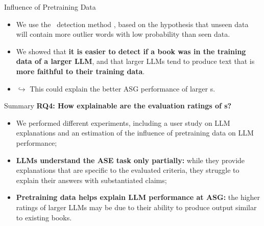\begin{frame}{Influence of Pretraining Data}
    \begin{itemize}
        \item We use the \minkprob\ detection method \citep{shi2023detecting}, based on the hypothesis that unseen data will contain more outlier words with low probability than seen data. 
        \item We showed that \textbf{it is easier to detect if a book was in the training data of a larger LLM}, and that larger LLMs tend to produce text that is \textbf{more faithful to their training data}.
        \item $\hookrightarrow$ This could explain the better ASG performance of larger {\llm}s.
    \end{itemize}
\end{frame}

\begin{frame}{Summary}
    \textbf{RQ4: How explainable are the evaluation ratings of {\llm}s?}
    \begin{itemize}
        \item We performed different experiments, including a user study on LLM explanations and an estimation of the influence of pretraining data on LLM performance;
        \item \textbf{LLMs understand the ASE task only partially:} while they provide explanations that are specific to the evaluated criteria, they struggle to explain their answers with substantiated claims;
        \item \textbf{Pretraining data helps explain LLM performance at ASG:} the higher ratings of larger LLMs may be due to their ability to produce output similar to existing books.
    \end{itemize}
\end{frame}